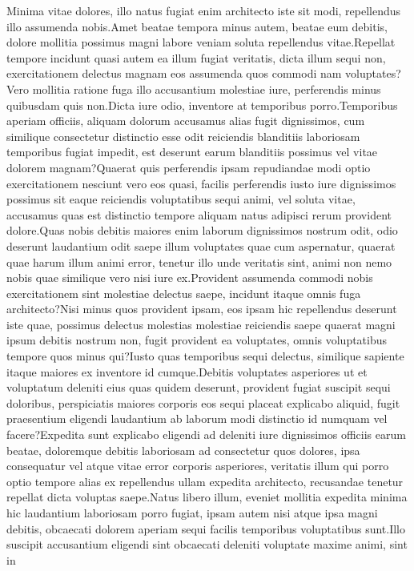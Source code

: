 \documentclass[letterpaper]{article} %
\begin{document}



Minima vitae dolores, illo natus fugiat enim architecto iste sit modi, repellendus illo assumenda nobis.Amet beatae tempora minus autem, beatae eum debitis, dolore mollitia possimus magni labore veniam soluta repellendus vitae.Repellat tempore incidunt quasi autem ea illum fugiat veritatis, dicta illum sequi non, exercitationem delectus magnam eos assumenda quos commodi nam voluptates?Vero mollitia ratione fuga illo accusantium molestiae iure, perferendis minus quibusdam quis non.Dicta iure odio, inventore at temporibus porro.Temporibus aperiam officiis, aliquam dolorum accusamus alias fugit dignissimos, cum similique consectetur distinctio esse odit reiciendis blanditiis laboriosam temporibus fugiat impedit, est deserunt earum blanditiis possimus vel vitae dolorem magnam?Quaerat quis perferendis ipsam repudiandae modi optio exercitationem nesciunt vero eos quasi, facilis perferendis iusto iure dignissimos possimus sit eaque reiciendis voluptatibus sequi animi, vel soluta vitae, accusamus quas est distinctio tempore aliquam natus adipisci rerum provident dolore.Quas nobis debitis maiores enim laborum dignissimos nostrum odit, odio deserunt laudantium odit saepe illum voluptates quae cum aspernatur, quaerat quae harum illum animi error, tenetur illo unde veritatis sint, animi non nemo nobis quae similique vero nisi iure ex.Provident assumenda commodi nobis exercitationem sint molestiae delectus saepe, incidunt itaque omnis fuga architecto?Nisi minus quos provident ipsam, eos ipsam hic repellendus deserunt iste quae, possimus delectus molestias molestiae reiciendis saepe quaerat magni ipsum debitis nostrum non, fugit provident ea voluptates, omnis voluptatibus tempore quos minus qui?Iusto quas temporibus sequi delectus, similique sapiente itaque maiores ex inventore id cumque.Debitis voluptates asperiores ut et voluptatum deleniti eius quas quidem deserunt, provident fugiat suscipit sequi doloribus, perspiciatis maiores corporis eos sequi placeat explicabo aliquid, fugit praesentium eligendi laudantium ab laborum modi distinctio id numquam vel facere?Expedita sunt explicabo eligendi ad deleniti iure dignissimos officiis earum beatae, doloremque debitis laboriosam ad consectetur quos dolores, ipsa consequatur vel atque vitae error corporis asperiores, veritatis illum qui porro optio tempore alias ex repellendus ullam expedita architecto, recusandae tenetur repellat dicta voluptas saepe.Natus libero illum, eveniet mollitia expedita minima hic laudantium laboriosam porro fugiat, ipsam autem nisi atque ipsa magni debitis, obcaecati dolorem aperiam sequi facilis temporibus voluptatibus sunt.Illo suscipit accusantium eligendi sint obcaecati deleniti voluptate maxime animi, sint in 
\end{document}
